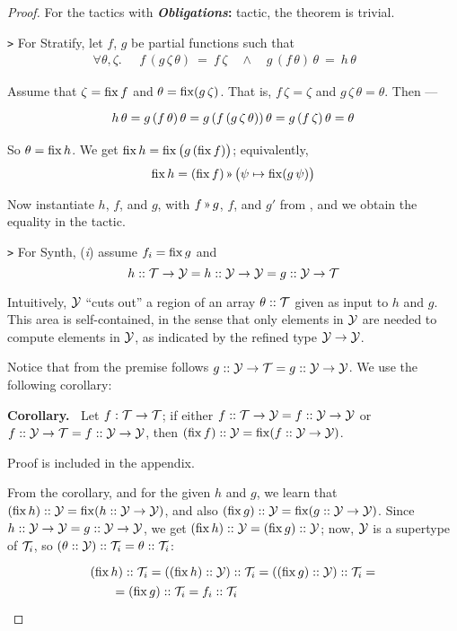 \begin{proof}
For the tactics with \textbf{\textit{Obligations}:} tactic, the theorem is trivial.

\medskip
\noindent
{\tt >} For {\sf Stratify}, let $f$, $g$ be partial functions such that
\vspace{-.5em}
\[\renewcommand\arraystretch{1.3}
  \forall \theta,\zeta.\quad \begin{array}{l}f\,(g\,\zeta\,\theta) ~=~ f\,\zeta \quad\land\quad
  g\,(f\,\theta)\,\theta ~=~ h\,\theta
  \end{array}\quad\]
  
Assume that $\zeta = \operatorname{fix} f$ and $\theta = \operatorname{fix} (g\,\zeta)$. 
That is, $f\,\zeta = \zeta$ and $g\,\zeta\,\theta = \theta$.
Then ---
\vspace{-.5em}
\[\renewcommand\arraystretch{1.3}
  \begin{array}{l@{}l}
   h\,\theta & {}= g\,(f\,\theta)\,\theta = g\,(f\,(g\,\zeta\,\theta))\,\theta =
              g\,(f\,\zeta)\,\theta = \theta
  \end{array}\]
  
\noindent
So $\theta = \operatorname{fix} h$. We get $\operatorname{fix} h = \operatorname{fix} \big(g \,(\operatorname{fix} f)\big)$; equivalently,
\[\fix h = (\fix f) \applt \big(\psi\mapsto\fix (g\,\psi)\big)\]

Now instantiate $h$, $f$, and $g$, with $f\applt g$, $f$, and $g'$ from ,
and we obtain the equality in the tactic.

\medskip
\noindent
{\tt >} For {\sf Synth}, ({\it i}) assume $f_i=\operatorname{fix} g$ and
\[h :: \mathcal{T}\to\mathcal{Y} = h :: \mathcal{Y}\to\mathcal{Y} = g :: \mathcal{Y}\to\mathcal{T}\]

Intuitively, $\mathcal{Y}$ ``cuts out'' a region of an array $\theta :: \mathcal{T}$ given
as input to $h$ and $g$. This area is self-contained, in the sense that
only elements in $\mathcal{Y}$ are needed to compute elements in $\mathcal{Y}$, as indicated
by the refined type $\mathcal{Y}\to\mathcal{Y}$.

Notice that from the premise follows $g :: \mathcal{Y}\to\mathcal{T} = g :: \mathcal{Y}\to\mathcal{Y}$. We use the following corollary:

\medskip\noindent
{\bf Corollary.~} Let $f : \mathcal{T}\to\mathcal{T}$; if either $f :: \mathcal{T}\to\mathcal{Y} = f :: \mathcal{Y}\to\mathcal{Y}$ or $f :: \mathcal{Y}\to\mathcal{T} = f :: \mathcal{Y}\to\mathcal{Y}$, 
then $(\operatorname{fix} f)::\mathcal{Y} = \operatorname{fix} (f :: \mathcal{Y}\to\mathcal{Y})$.

Proof is included in the appendix.

\medskip
From the corollary, and for the given $h$ and $g$, we learn that $(\operatorname{fix} h)::\mathcal{Y} = \operatorname{fix}(h::\mathcal{Y}\to\mathcal{Y})$,
and also $(\operatorname{fix} g)::\mathcal{Y}=\operatorname{fix}(g::\mathcal{Y}\to\mathcal{Y})$. Since $h::\mathcal{Y}\to\mathcal{Y}=g::\mathcal{Y}\to\mathcal{Y}$,
we get $(\operatorname{fix} h)::\mathcal{Y} = (\operatorname{fix} g)::\mathcal{Y}$; now, $\mathcal{Y}$ is a supertype of $\mathcal{T}_i$, so $(\theta::\mathcal{Y})::\mathcal{T}_i=\theta::\mathcal{T}_i$:
\[\renewcommand\arraystretch{1.3}
  \begin{array}{l}(\fix h)::\T_i = ((\fix h)::\Y)::\T_i = ((\fix g)::\Y)::\T_i = \\
    \qquad = (\fix g)::\T_i=f_i::\T_i
  \end{array}\]


\end{proof}
